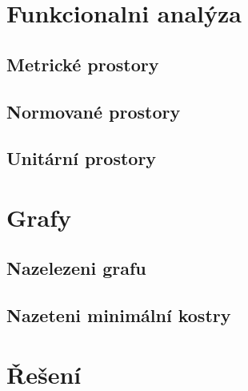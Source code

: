 \documentclass[12pt,a4paper,notitlepage,final]{article}
\begin{document}
\section{Funkcionalni analýza}
\subsection{Metrické prostory}               	
\subsection{Normované prostory}              	
\subsection{Unitární prostory}               	
\section{Grafy}
\subsection{Nazelezeni grafu}                	
\subsection{Nazeteni minimální kostry} 				

\section*{Řešení}
\setcounter{section}{1}
\end{document}
